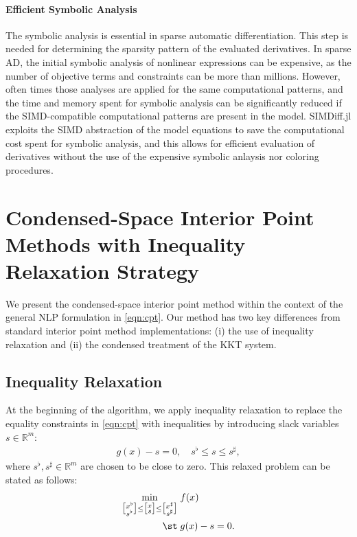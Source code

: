 \paragraph{Efficient Symbolic Analysis}
The symbolic analysis is essential in sparse automatic
differentiation. This step is needed for determining the sparsity
pattern of the evaluated derivatives. In sparse AD, the initial
symbolic analysis of nonlinear expressions can be expensive, as the
number of objective terms and constraints can be more than
millions. However, often times those analyses are applied for the same
computational patterns, and the time and memory spent for symbolic
analysis can be significantly reduced if the SIMD-compatible
computational patterns are present in the model. SIMDiff.jl exploits
the SIMD abstraction of the model equations to save the computational
cost spent for symbolic analysis, and this allows for efficient
evaluation of derivatives without the use of the expensive symbolic
anlaysis nor coloring procedures.



\section{Condensed-Space Interior Point Methods with Inequality Relaxation Strategy}\label{sec:ipm}
We present the condensed-space interior point method within the
context of the general NLP formulation in \eqref{eqn:cpt}. Our method
has two key differences from standard interior point method
implementations: (i) the use of inequality relaxation and (ii) the
condensed treatment of the KKT system.

\subsection{Inequality Relaxation}

At the beginning of the algorithm, we apply inequality relaxation to replace the equality constraints in \eqref{eqn:cpt} with inequalities by introducing slack variables $s\in\mathbb{R}^{m}$:
\begin{align}\label{eqn:relax}
  g(x)- s = 0,\quad s^{\flat}\leq s\leq  s^\sharp,
\end{align}
where $s^\flat,s^\sharp\in\mathbb{R}^{m}$ are chosen to be close to zero.
This relaxed problem can be stated as follows:
\begin{align}\label{eqn:relaxed} 
  \begin{aligned}[t]
    \min_{\big[\substack{x^\flat\\s^\flat}\big]\leq \big[\substack{x\\s}\big] \leq \big[\substack{x^\sharp\\s^\sharp}\big]}\;
    &  f(x)\\
    \st\;
    & g(x) - s = 0.
  \end{aligned}
\end{align}

